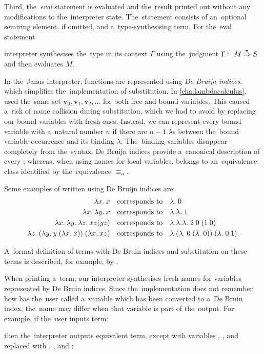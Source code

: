 Third, the~\emph{eval} statement is evaluated and the~result printed out without
any modifications to the~interpreter state. The~statement consists of
an~optional semiring element, \quant{$\omega$} if omitted, and
a~type-synthesising term. For the~eval statement
\begin{center}
\end{center}
interpreter synthesises the~type in its context $\Gamma$ using the~judgment
$\Gamma \vdash M \overset{\!{\pi}}\Rightarrow S$ and then evaluates $M$.


In the~Janus interpreter, functions are represented using
\emph{De Bruijn indices}, which simplifies the~implementation of substitution.
In \autoref{cha:lambdacalculus}, \lts used the~same set
$\mathbf{v}_0, \mathbf{v}_1, \mathbf{v}_2, \dots$ for both free and bound
variables. This caused a~risk of name collision during substitution, which we
had to avoid by replacing our bound variables with fresh ones. Instead, we can
represent every bound variable with a~natural number $n$ if there are $n-1$
$\lambda$s between the~bound variable occurrence and its binding $\lambda$.
The~binding variables disappear completely from the~syntax. De Bruijn indices
provide a~canonical description of every \lt; whereas, when using names for
local variables, \lt belongs to an~equivalence class identified by
the~equivalence $\equiv_\alpha$.

Some examples of \lts written using De Bruijn indices are:
\begin{align*}
  \lambda x . \: x \quad &\text{corresponds to} \quad \lambda. \; 0 \\
  \lambda x . \: \lambda y . \: x \quad &\text{corresponds to} \quad \lambda. \lambda. \; 1 \\
  \lambda x . \: \lambda y . \: \lambda z . \: x z (y z) \quad &\text{corresponds to} \quad
    \lambda. \lambda. \lambda. \; 2 \; 0 \; (1 \; 0) \\
  \lambda z . \: (\lambda y . \: y \; (\lambda x . \: x))\;(\lambda x . \: x z)\quad&\text{corresponds to}
    \quad \lambda. (\lambda. \; 0 \; (\lambda. \; 0)) \; (\lambda. \; 0 \; 1).
\end{align*}

A~formal definition of terms with De Bruin indices and substitution on these
terms is described, for example, by \citet[Chapter~6]{pierce_2002}.

When printing a~term, our interpreter synthesises fresh names for variables
represented by De Bruin indices. Since the~implementation does not remember how
has the~user called a~variable which has been converted to a~De Bruin index,
the~name may differ when that variable is part of the~output. For example, if
the~user inputs term:
\begin{center}
\end{center}
then the~interpreter outputs equivalent term, except with variables
, , and  replaced with
, , and :

\begin{center}
\end{center}

